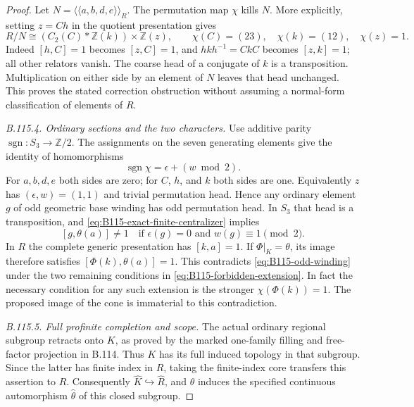 \begin{proof}
Let $N=\langle\!\langle a,b,d,e\rangle\!\rangle_R$.
The permutation map $\chi$ kills $N$. More explicitly, setting
$z=Ch$ in the quotient presentation gives
\begin{equation}\label{eq:B115-coarse-map}
 R/N\cong
 (C_2(C)*\mathbb Z(k))\times\mathbb Z(z),\qquad
 \chi(C)=(23),\quad\chi(k)=(12),\quad\chi(z)=1.
\end{equation}
Indeed $[h,C]=1$ becomes $[z,C]=1$, and
$hkh^{-1}=CkC$ becomes $[z,k]=1$; all other relators vanish.
The coarse head of a conjugate of $k$ is a transposition.
Multiplication on either side by an element of $N$ leaves that head
unchanged. This proves the stated correction obstruction without
assuming a normal-form classification of elements of $R$.

\emph{B.115.4. Ordinary sections and the two characters.}
Use additive parity $\operatorname{sgn}:S_3\to\mathbb Z/2$.
The assignments on the seven generating elements give the identity
of homomorphisms
\begin{equation}\label{eq:B115-parity}
 \operatorname{sgn}\chi=\epsilon+(w\bmod2).
\end{equation}
For $a,b,d,e$ both sides are zero; for $C$, $h$, and $k$ both
sides are one. Equivalently $z$ has $(\epsilon,w)=(1,1)$ and
trivial permutation head. Hence any ordinary element $g$ of odd
geometric base winding has odd permutation head. In $S_3$ that head
is a transposition, and \eqref{eq:B115-exact-finite-centralizer}
implies
\begin{equation}\label{eq:B115-odd-winding}
 [g,\theta(a)]\ne1
 \quad\text{if }\epsilon(g)=0\text{ and }w(g)\equiv1\pmod2.
\end{equation}
In $R$ the complete generic presentation has $[k,a]=1$.
If $\Phi|_K=\theta$, its image therefore satisfies
$[\Phi(k),\theta(a)]=1$. This contradicts
\eqref{eq:B115-odd-winding} under the two remaining conditions in
\eqref{eq:B115-forbidden-extension}. In fact the necessary condition
for any such extension is the stronger $\chi(\Phi(k))=1$.
The proposed image of the cone is immaterial to this contradiction.

\emph{B.115.5. Full profinite completion and scope.}
The actual ordinary regional subgroup retracts onto $K$, as proved
by the marked one-family filling and free-factor projection in
B.114. Thus $K$ has its full induced topology in that subgroup.
Since the latter has finite index in $R$, taking the finite-index
core transfers this assertion to $R$. Consequently
$\widehat K\hookrightarrow\widehat R$, and $\theta$ induces the
specified continuous automorphism $\widehat\theta$ of this closed
subgroup.


\end{proof}
